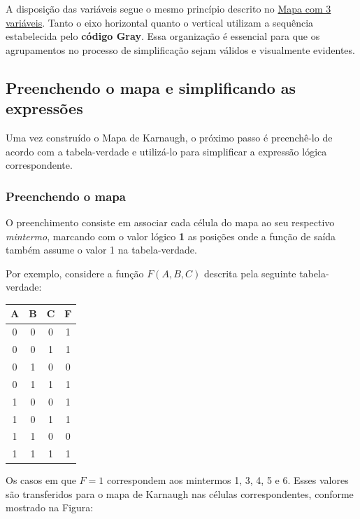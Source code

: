 \documentclass[12pt]{article}
\begin{document}
\begin{tcolorbox}[mynote, title=\textbf{Ordem das Variáveis (4 variáveis)}]
A disposição das variáveis segue o mesmo princípio descrito no \hyperref[subsec:3variaveis]{Mapa com 3 variáveis}.  
Tanto o eixo horizontal quanto o vertical utilizam a sequência estabelecida pelo \textbf{código Gray}.  
Essa organização é essencial para que os agrupamentos no processo de simplificação sejam válidos e visualmente evidentes.
\end{tcolorbox}

\subsection{Preenchendo o mapa e simplificando as expressões}

Uma vez construído o Mapa de Karnaugh, o próximo passo é preenchê-lo de acordo com a tabela-verdade e utilizá-lo para simplificar a expressão lógica correspondente.

\subsubsection{Preenchendo o mapa}

O preenchimento consiste em associar cada célula do mapa ao seu respectivo \textit{mintermo}, marcando com o valor lógico \textbf{1} as posições onde a função de saída também assume o valor 1 na tabela-verdade.

Por exemplo, considere a função \(F(A,B,C)\) descrita pela seguinte tabela-verdade:

\begin{table}[H]
\centering
\begin{tabular}{|c|c|c|c|}
\hline
A & B & C & F \\
\hline
0 & 0 & 0 & 1 \\
0 & 0 & 1 & 1 \\
0 & 1 & 0 & 0 \\
0 & 1 & 1 & 1 \\
1 & 0 & 0 & 1 \\
1 & 0 & 1 & 1 \\
1 & 1 & 0 & 0 \\
1 & 1 & 1 & 1 \\
\hline
\end{tabular}
\end{table}

Os casos em que \(F=1\) correspondem aos mintermos 1, 3, 4, 5 e 6.  
Esses valores são transferidos para o mapa de Karnaugh nas células correspondentes, conforme mostrado na Figura:
\end{document}

